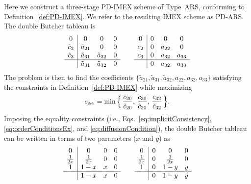 Here we construct a three-stage PD-IMEX scheme of Type~ARS, conforming to Definition~\ref{def:PD-IMEX}.  
We refer to the resulting IMEX scheme as PD-ARS.  
The double Butcher tableau is
\begin{equation}
  \begin{array}{c | c c c}
  	         0           & 0                 & 0                   & 0  \\
  	\tilde{c}_{2} & \tilde{a}_{21} & 0                   & 0  \\
  	\tilde{c}_{3} & \tilde{a}_{31} & \tilde{a}_{32} & 0  \\ \hline
  	                   & \tilde{a}_{31} & \tilde{a}_{32} & 0
  \end{array}
  \qquad
  \begin{array}{c | c c c}
  	     0  & 0  & 0         & 0          \\
  	c_{2} & 0 & a_{22} & 0          \\
  	c_{3} & 0 & a_{32} & a_{33}  \\ \hline
  	         & 0 & a_{32} & a_{33}
  \end{array}
\end{equation}
The problem is then to find the coefficients $\{ \tilde{a}_{21}, \tilde{a}_{31}, \tilde{a}_{32}, a_{22}, a_{32}, a_{33} \}$ satisfying the constraints in Definition~\ref{def:PD-IMEX} while maximizing
\begin{equation}
  c_{\mbox{\tiny Sch}} = \min \Big\{\, \dfrac{c_{20}}{\tilde{c}_{20}},\, \dfrac{c_{30}}{\tilde{c}_{30}},\, \dfrac{c_{32}}{\tilde{c}_{32}} \,\Big\}.  
\end{equation}
Imposing the equality constraints (i.e., Eqs.~\eqref{eq:implicitConsistency}, \eqref{eq:orderConditionsEx}, and \eqref{eq:diffusionCondition}), the double Butcher tableau can be written in terms of two parameters ($x$ and $y$) as
\begin{equation}
  \begin{array}{c | c c c}
  	     0       & 0            & 0 & 0 \\
  	\frac{1}{2x} & \frac{1}{2x} & 0 & 0 \\
  	     1       & 1-x          & x & 0 \\ \hline
  	             & 1-x          & x & 0
  \end{array}
  \qquad
  \begin{array}{c | c c c}
  	     0       & 0 & 0            & 0 \\
  	\frac{1}{2x} & 0 & \frac{1}{2x} & 0 \\
  	     1       & 0 & 1-y          & y \\ \hline
  	             & 0 & 1-y          & y
  \end{array}
\end{equation}
